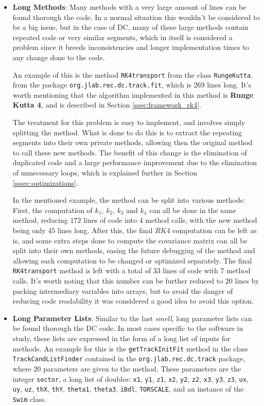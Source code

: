     \begin{itemize}
        \item \textbf{Long Methods}: Many methods with a very large amount of lines can be found thorough the code.
        In a normal situation this wouldn't be considered to be a big issue, but in the case of DC, many of these large methods contain repeated code or very similar segments, which in itself is considered a problem since it breeds inconsistencies and longer implementation times to any change done to the code.
        
        An example of this is the method \texttt{RK4transport} from the class \texttt{RungeKutta}, from the package \texttt{org.jlab.rec.dc.track.fit}, which is $269$ lines long.
        It's worth mentioning that the algorithm implemented in this method is \textbf{Runge Kutta 4}, and is described in Section \ref{ssec:framework_rk4}.

        The treatment for this problem is easy to implement, and involves simply splitting the method.
        What is done to do this is to extract the repeating segments into their own private methods, allowing then the original method to call these new methods.
        The benefit of this change is the elimination of duplicated code and a large performance improvement due to the elimination of unnecessary loops, which is explained further in Section \ref{sssec:optimizations}.
    
        In the mentioned example, the method can be split into various methods: First, the computation of $k_1$, $k_2$, $k_3$ and $k_4$ can all be done in the same method, reducing $172$ lines of code into $4$ method calls, with the new method being only $45$ lines long.
        After this, the final $RK4$ computation can be left as is, and some extra steps done to compute the covariance matrix can all be split into their own methods, easing the future debugging of the method and allowing each computation to be changed or optimized separately.
        The final \texttt{RK4transport} method is left with a total of $33$ lines of code with $7$ method calls.
        It's worth noting that this number can be further reduced to $20$ lines by packing intermediary variables into arrays, but to avoid the danger of reducing code readability it was considered a good idea to avoid this option.

        \item \textbf{Long Parameter Lists}: Similar to the last \textit{smell}, long parameter lists can be found thorough the DC code.
        In most cases specific to the software in study, these lists are expressed in the form of a long list of inputs for methods.
        An example for this is the \texttt{getTrackInitFit} method in the class \texttt{TrackCandListFinder} contained in the \texttt{org.jlab.rec.dc.track} package, where $20$ parameters are given to the method.
        These parameters are the integer \texttt{sector}, a long list of doubles: \texttt{x1}, \texttt{y1}, \texttt{z1}, \texttt{x2}, \texttt{y2}, \texttt{z2}, \texttt{x3}, \texttt{y3}, \texttt{z3}, \texttt{ux}, \texttt{uy}, \texttt{uz}, \texttt{thX}, \texttt{thY}, \texttt{theta1}, \texttt{theta3}, \texttt{iBdl}, \texttt{TORSCALE}, and an instance of the \texttt{Swim} class.
    

\end{itemize}
